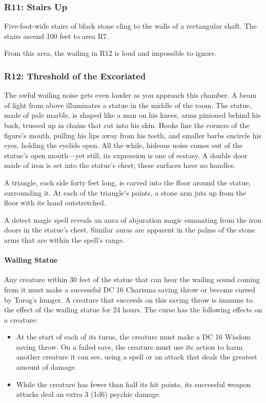 \documentclass[10pt,a4paper,twoside,bg=print,twocolumn,openany,nodeprecatedcode]{dndbook}
\begin{document}
\subsubsection{R11: Stairs Up}
Five-foot-wide stairs of black stone cling to the walls of a rectangular shaft. The stairs ascend 100 feet to area R7.

From this area, the wailing in R12 is loud and impossible to ignore.



\subsubsection{R12: Threshold of the Excoriated}
\begin{DndReadAloud}{}
The awful wailing noise gets even louder as you approach this chamber. A beam of light from above illuminates a statue in the middle of the room. The statue, made of pale marble, is shaped like a man on his knees, arms pinioned behind his back, trussed up in chains that cut into his skin. Hooks line the corners of the figure's mouth, pulling his lips away from his teeth, and smaller barbs encircle his eyes, holding the eyelids open. All the while, hideous noise comes out of the statue's open mouth—yet still, its expression is one of ecstasy. A double door made of iron is set into the statue's chest; these surfaces have no handles.

A triangle, each side forty feet long, is carved into the floor around the statue, surrounding it. At each of the triangle's points, a stone arm juts up from the floor with its hand outstretched.

\end{DndReadAloud}

A detect magic spell reveals an aura of abjuration magic emanating from the iron doors in the statue's chest. Similar auras are apparent in the palms of the stone arms that are within the spell's range.


\paragraph{Wailing Statue}
Any creature within 30 feet of the statue that can hear the wailing sound coming from it must make a successful DC 16 Charisma saving throw or become cursed by Torog's hunger. A creature that succeeds on this saving throw is immune to the effect of the wailing statue for 24 hours. The curse has the following effects on a creature:


\begin{itemize}
\item At the start of each of its turns, the creature must make a DC 16 Wisdom saving throw. On a failed save, the creature must use its action to harm another creature it can see, using a spell or an attack that deals the greatest amount of damage.
\item While the creature has fewer than half its hit points, its successful weapon attacks deal an extra 3 (1d6) psychic damage.
\end{itemize}
\end{document}
